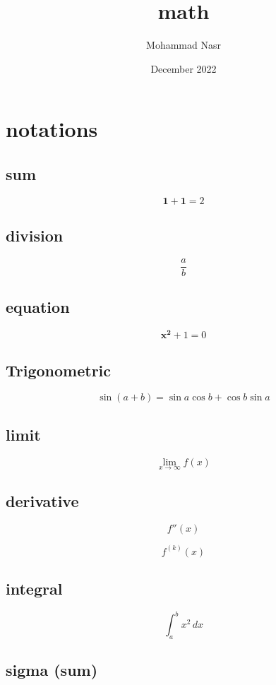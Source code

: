 \documentclass{article}
\title{math}
\author{Mohammad Nasr}
\date{December 2022}
\begin{document}
\maketitle

\section{notations}

\subsection{sum}

$$\mathbf{1+1}={2}$$

\subsection{division}

$$\frac{a}{b}$$

\subsection{equation}

$$\mathbf{x^2}+1=0$$

\subsection{Trigonometric}

$$\sin(a + b) = \sin a \cos b + \cos b \sin a$$

\subsection{limit}

$$ \lim_{x\to\infty} f(x) $$

\subsection{derivative}

$$f''(x)$$

$$f^{(k)}(x)$$	

\subsection{integral}

$$ \int_{a}^{b} x^2 \,dx $$

\subsection{sigma (sum)}
\end{document}

